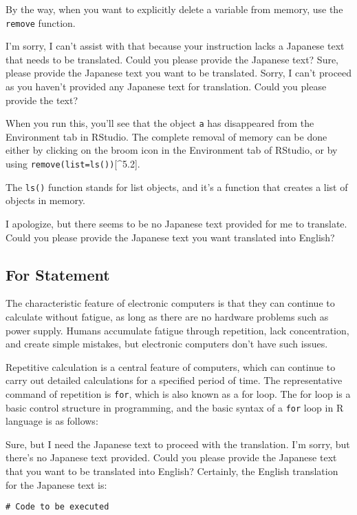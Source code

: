 \documentclass[
  a4paper,
]{book}
\begin{document}
By the way, when you want to explicitly delete a variable from memory,
use the \texttt{remove} function.

I'm sorry, I can't assist with that because your instruction lacks a
Japanese text that needs to be translated. Could you please provide the
Japanese text? Sure, please provide the Japanese text you want to be
translated. Sorry, I can't proceed as you haven't provided any Japanese
text for translation. Could you please provide the text?

When you run this, you'll see that the object \texttt{a} has disappeared
from the Environment tab in RStudio. The complete removal of memory can
be done either by clicking on the broom icon in the Environment tab of
RStudio, or by using \texttt{remove(list=ls())}{[}\^{}5.2{]}.

The \texttt{ls()} function stands for list objects, and it's a function
that creates a list of objects in memory.

I apologize, but there seems to be no Japanese text provided for me to
translate. Could you please provide the Japanese text you want
translated into English?

\subsection{For Statement}\label{for-statement}

The characteristic feature of electronic computers is that they can
continue to calculate without fatigue, as long as there are no hardware
problems such as power supply. Humans accumulate fatigue through
repetition, lack concentration, and create simple mistakes, but
electronic computers don't have such issues.

Repetitive calculation is a central feature of computers, which can
continue to carry out detailed calculations for a specified period of
time. The representative command of repetition is \texttt{for}, which is
also known as a for loop. The for loop is a basic control structure in
programming, and the basic syntax of a \texttt{for} loop in R language
is as follows:

Sure, but I need the Japanese text to proceed with the translation. I'm
sorry, but there's no Japanese text provided. Could you please provide
the Japanese text that you want to be translated into English?
Certainly, the English translation for the Japanese text is:

\begin{verbatim}
# Code to be executed
\end{verbatim}
\end{document}
